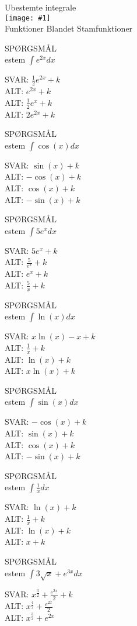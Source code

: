 \documentclass[]{article}
\newcounter{spgcounter}
\newenvironment{question}[2]{\addtocounter{spgcounter}{1} SPØRGSMÅL \thespgcounter\\}{\hspace{50px}}
\newcommand{\name}[1]{{\huge #1}\\}
\newcommand{\tag}[1]{#1}
\newcommand{\cover}[1]{\texttt{[image: \#1]}\\}
\newcommand{\answer}[1]{{\color{green} SVAR: #1}\\}
\newcommand{\alt}[1]{{\color{red} ALT: #1}\\}
\begin{document}
\name{Ubestemte integrale}
\cover{sinintegral.png}
\tag{Funktioner}
\tag{Blandet}
\tag{Stamfunktioner}

\begin{question}{multi}

Bestem $\int{e^{2x}} dx$

\answer{$\frac{1}{2}e^{2x} + k$}
\alt{$e^{2x} + k$}
\alt{$\frac{1}{2}e^{x} + k$}
\alt{$2e^{2x} + k$}

\end{question}

\begin{question}{multi}

Bestem $\int{\cos(x)} dx$

\answer{$\sin(x) + k$}
\alt{$-\cos(x) + k$}
\alt{$\cos(x) + k$}
\alt{$-\sin(x) + k$}

\end{question}

\begin{question}{multi}

Bestem $\int{5e^x} dx$

\answer{$5e^x + k$}
\alt{$\frac{5}{e^x} + k$}
\alt{$e^x + k$}
\alt{$\frac{5}{x} + k$}

\end{question}

\begin{question}{multi}

Bestem $\int{\ln(x)} dx$

\answer{$x\ln(x) - x + k$}
\alt{$\frac{1}{x} + k$}
\alt{$\ln(x) + k$}
\alt{$x\ln(x) + k$}

\end{question}

\begin{question}{multi}

Bestem $\int{\sin(x)} dx$

\answer{$-\cos(x) + k$}
\alt{$\sin(x) + k$}
\alt{$\cos(x) + k$}
\alt{$-\sin(x) + k$}

\end{question}

\begin{question}{multi}

Bestem $\int \frac{1}{x} dx $

\answer{$\ln(x) + k$}
\alt{$\frac{1}{x} + k$}
\alt{$\ln(x) + k$}
\alt{$x + k$}

\end{question}

\begin{question}{multi}

Bestem $\int 3 \sqrt{x} + e^{3 x} dx$
    
\answer{$x^{\frac{3}{2}} + \frac{e^{2x}}{2} + k$}
\alt{$x^{\frac{4}{2}} + \frac{e^{2x}}{2}$}
\alt{$x^{\frac{3}{2}} + e^{2x}$}

\end{question}
\end{document}
